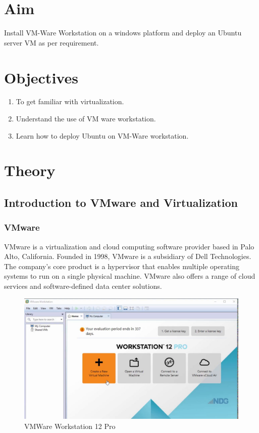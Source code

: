 \documentclass[11pt]{article}
\begin{document}
\tableofcontents
\thispagestyle{empty}
\clearpage

\setcounter{page}{1}

\section{Aim}
Install VM-Ware Workstation on a windows platform and deploy an Ubuntu server VM as per
requirement.

\section{Objectives}
\begin{enumerate}
    \item To get familiar with virtualization.
    \item Understand the use of VM ware workstation.
    \item Learn how to deploy Ubuntu on VM-Ware workstation.
\end{enumerate}

\section{Theory}

\subsection{Introduction to VMware and Virtualization}

\subsubsection{VMware}

VMware is a virtualization and cloud computing software provider based in Palo Alto, California. Founded in 1998, VMware is a subsidiary of Dell Technologies. The company's core product is a hypervisor that enables multiple operating systems to run on a single physical machine. VMware also offers a range of cloud services and software-defined data center solutions.

\begin{figure}[H]
    \centering
    \includegraphics[width=.95\textwidth]{vmware.png}
    \caption{VMWare Workstation 12 Pro}
\end{figure}
\end{document}
